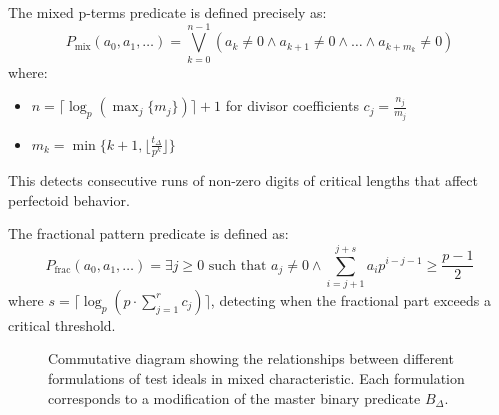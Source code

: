 \begin{definition}\label{def:mixed-p-terms}
The mixed p-terms predicate is defined precisely as:
$$P_{\text{mix}}(a_0, a_1, \ldots) = \bigvee_{k=0}^{n-1} \left(a_k \neq 0 \wedge a_{k+1} \neq 0 \wedge \ldots \wedge a_{k+m_k} \neq 0\right)$$
where:
\begin{itemize}
    \item $n = \lceil \log_p(\max_j\{m_j\}) \rceil + 1$ for divisor coefficients $c_j = \frac{n_j}{m_j}$
    \item $m_k = \min\{k+1, \lfloor \frac{t_{\Delta}}{p^k} \rfloor\}$
\end{itemize}

This detects consecutive runs of non-zero digits of critical lengths that affect perfectoid behavior.
\end{definition}

\begin{definition}\label{def:fractional-pattern}
The fractional pattern predicate is defined as:
$$P_{\text{frac}}(a_0, a_1, \ldots) = \exists j \geq 0 \text{ such that } a_j \neq 0 \wedge \sum_{i=j+1}^{j+s} a_i p^{i-j-1} \geq \frac{p-1}{2}$$
where $s = \lceil \log_p(p \cdot \sum_{j=1}^{r} c_j) \rceil$, detecting when the fractional part exceeds a critical threshold.
\end{definition}

\begin{figure}[ht]
\begin{center}
\end{center}
\caption{Commutative diagram showing the relationships between different formulations of test ideals in mixed characteristic. Each formulation corresponds to a modification of the master binary predicate $B_\Delta$.}
\label{fig:test-ideal-relationships}
\end{figure}

